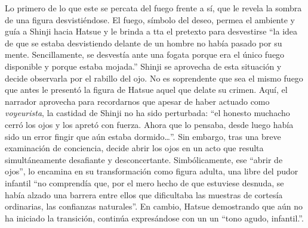 Lo primero de lo que este se percata del fuego frente a sí, que le revela la sombra de una figura desvistiéndose. El fuego, símbolo del deseo, permea el ambiente y guía a Shinji hacia Hatsue y le brinda a tta el pretexto para desvestirse ``la idea de que se estaba desvistiendo delante de un hombre no había pasado por su mente. Sencillamente, se desvestía ante una fogata porque era el único fuego disponible y porque estaba mojada.''%
Shinji se aprovecha de esta situación y decide observarla por el rabillo del ojo.
No es soprendente que sea el mismo fuego que antes le presentó la figura de Hatsue aquel que delate su crimen.
Aquí, el narrador aprovecha para recordarnos que apesar de haber actuado como \emph{voyeurista}, la castidad de Shinji no ha sido perturbada: ``el honesto muchacho cerró los ojos y los apretó con fuerza. Ahora que lo pensaba, desde luego había sido un error fingir que aún estaba dormido\ldots''.
Sin embargo, tras una breve examinación de conciencia, decide abrir los ojos en un acto que resulta simultáneamente desafiante y desconcertante.
Simbólicamente, ese ``abrir de ojos'', lo encamina en su transformación como figura adulta, una libre del pudor infantil ``no comprendía que, por el mero hecho de que estuviese desnuda, se había alzado una barrera entre ellos que dificultaba las muestras de cortesía ordinarias, las confianzas naturales''.
En cambio, Hatsue demostrando que aún no ha iniciado la transición, continúa expresándose con un un ``tono agudo, infantil.''.

